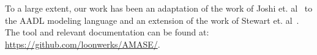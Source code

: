 To a large extent, our work has been an adaptation of the work of Joshi et. al~\cite {Joshi05:Dasc} to the AADL modeling language and an extension of the work of Stewart et. al~\cite{Stewart17:IMBSA}. The tool and relevant documentation can be found at: \small \url{https://github.com/loonwerks/AMASE/}. \normalsize




